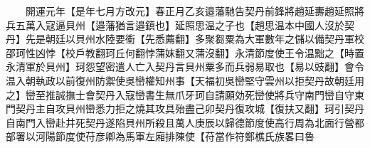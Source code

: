 　　開運元年【是年七月方改元】春正月乙亥邉藩馳告契丹前鋒將趙延夀趙延照將兵五萬入寇逼貝州【邉藩猶言邉鎮也】延照思温之子也【趙思温本中國人沒於契丹】先是朝廷以貝州水陸要衝【先悉薦翻】多聚芻粟為大軍數年之儲以備契丹軍校邵珂性凶悖【校戶教翻珂丘何翻悖蒲妺翻又蒲沒翻】永清節度使王令温黜之【時置永清軍於貝州】珂怨望密遣人亡入契丹言貝州粟多而兵弱易取也【易以豉翻】會令温入朝執政以前復州防禦使吳巒權知州事【天福初吳巒堅守雲州以拒契丹故朝廷用之】巒至推誠撫士會契丹入寇巒書生無爪牙珂自請願効死巒使將兵守南門巒自守東門契丹主自攻貝州巒悉力拒之燒其攻具殆盡己卯契丹復攻城【復扶又翻】珂引契丹自南門入巒赴井死契丹遂陷貝州所殺且萬人庚辰以歸德節度使高行周為北面行營都部署以河陽節度使苻彦卿為馬軍左廂排陳使【苻當作符鄭樵氏族畧曰魯